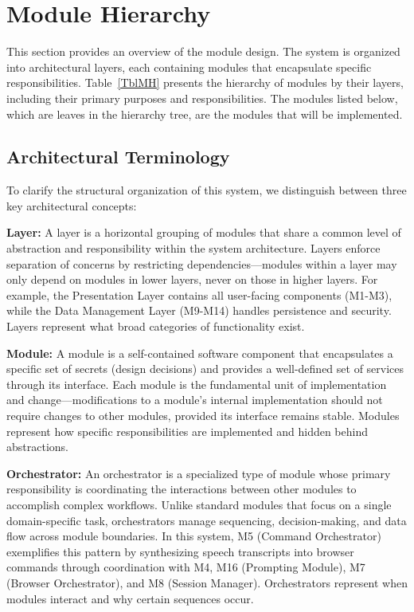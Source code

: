 \documentclass[12pt, titlepage]{article}
\begin{document}
\section{Module Hierarchy} \label{SecMH}

This section provides an overview of the module design. The system is organized into architectural layers, each containing modules that encapsulate specific responsibilities. Table~\ref{TblMH} presents the hierarchy of modules by their layers, including their primary purposes and responsibilities. The modules listed below, which are leaves in the hierarchy tree, are the modules that will be implemented.
\subsection{Architectural Terminology}

To clarify the structural organization of this system, we distinguish between three key architectural concepts:

\textbf{Layer:} A layer is a horizontal grouping of modules that share a common level of abstraction and responsibility within the system architecture. Layers enforce separation of concerns by restricting dependencies—modules within a layer may only depend on modules in lower layers, never on those in higher layers. For example, the Presentation Layer contains all user-facing components (M1-M3), while the Data Management Layer (M9-M14) handles persistence and security. Layers represent what broad categories of functionality exist.

\textbf{Module:} A module is a self-contained software component that encapsulates a specific set of secrets (design decisions) and provides a well-defined set of services through its interface. Each module is the fundamental unit of implementation and change—modifications to a module's internal implementation should not require changes to other modules, provided its interface remains stable. Modules represent how specific responsibilities are implemented and hidden behind abstractions.

\textbf{Orchestrator:} An orchestrator is a specialized type of module whose primary responsibility is coordinating the interactions between other modules to accomplish complex workflows. Unlike standard modules that focus on a single domain-specific task, orchestrators manage sequencing, decision-making, and data flow across module boundaries. In this system, M5 (Command Orchestrator) exemplifies this pattern by synthesizing speech transcripts into browser commands through coordination with M4, M16 (Prompting Module), M7 (Browser Orchestrator), and M8 (Session Manager). Orchestrators represent when modules interact and why certain sequences occur.
\end{document}
